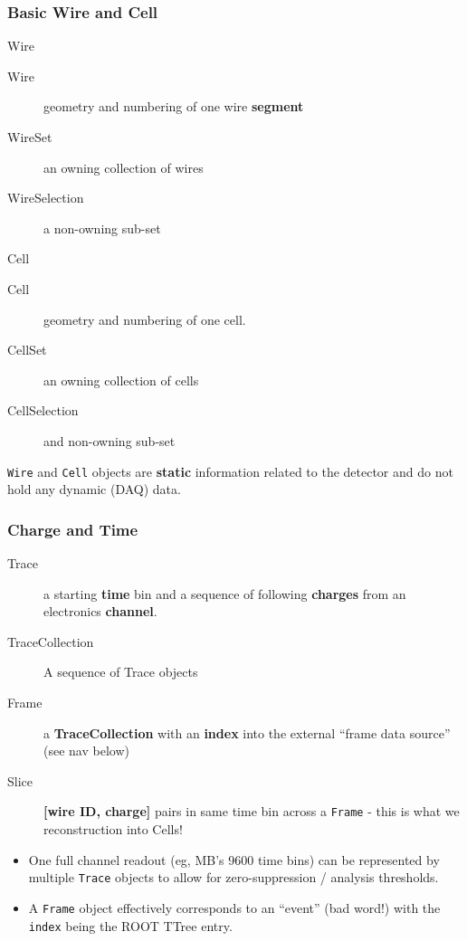 \documentclass[xcolor=dvipsnames]{beamer}
\begin{document}
\begin{frame}
  \frametitle{Basic Wire and Cell}
  Wire
  \begin{description}
  \item[Wire] geometry and numbering of one wire \textbf{segment}
  \item[WireSet] an owning collection of wires
  \item[WireSelection] a non-owning sub-set
  \end{description}
  Cell
  \begin{description}
  \item[Cell] geometry and numbering of one cell.
  \item[CellSet] an owning collection of cells
  \item[CellSelection] and non-owning sub-set
  \end{description}

  \texttt{Wire} and \texttt{Cell} objects are \textbf{static}
  information related to the detector and do not hold any dynamic
  (DAQ) data.
\end{frame}

\begin{frame}
  \frametitle{Charge and Time}
  \begin{description}
  \item[Trace] a starting \textbf{time} bin and a sequence of following \textbf{charges}
    from an electronics \textbf{channel}.
  \item[TraceCollection] A sequence of Trace objects
  \item[Frame] a \textbf{TraceCollection} with an \textbf{index} into the external
    ``frame data source'' (see nav below)
  \item[Slice] \textbf{[wire ID, charge]} pairs in same time bin across a
    \texttt{Frame} - this is what we reconstruction into Cells!
  \end{description}

  \footnotesize
  \begin{itemize}
  \item One full channel readout (eg, MB's 9600 time bins) can be
    represented by multiple \texttt{Trace} objects to allow for
    zero-suppression / analysis thresholds.
  \item A \texttt{Frame} object effectively corresponds to an ``event''
    (bad word!) with the \texttt{index} being the ROOT TTree entry.
  \end{itemize}
\end{frame}
\end{document}

